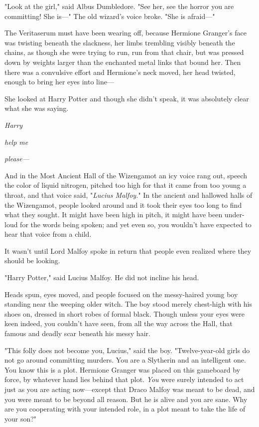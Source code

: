 "Look at the girl," said Albus Dumbledore. "See her, see the horror you are 
committing! She is---" The old wizard's voice broke. "She is afraid---"

The Veritaserum must have been wearing off, because Hermione Granger's face was 
twisting beneath the slackness, her limbs trembling visibly beneath the chains, 
as though she were trying to run, run from that chair, but was pressed down by 
weights larger than the enchanted metal links that bound her. Then there was a 
convulsive effort and Hermione's neck moved, her head twisted, enough to bring 
her eyes into line---

She looked at Harry Potter and though she didn't speak, it was absolutely clear 
what she was saying.

\emph{Harry}

\emph{help me}

\emph{please---}

And in the Most Ancient Hall of the Wizengamot an icy voice rang out, speech 
the color of liquid nitrogen, pitched too high for that it came from too young 
a throat, and that voice said, "\emph{Lucius Malfoy.}"
\sbreak
In the ancient and hallowed halls of the Wizengamot, people looked around and 
it took their eyes too long to find what they sought. It might have been high 
in pitch, it might have been under-loud for the words being spoken; and yet 
even so, you wouldn't have expected to hear that voice from a child.

It wasn't until Lord Malfoy spoke in return that people even realized where 
they should be looking.

"Harry Potter," said Lucius Malfoy. He did not incline his head.

Heads spun, eyes moved, and people focused on the messy-haired young boy 
standing near the weeping older witch. The boy stood merely chest-high with his 
shoes on, dressed in short robes of formal black. Though unless your eyes were 
keen indeed, you couldn't have seen, from all the way across the Hall, that 
famous and deadly scar beneath his messy hair.

"This folly does not become you, Lucius," said the boy. "Twelve-year-old girls 
do not go around committing murders. You are a Slytherin and an intelligent 
one. You know this is a plot. Hermione Granger was placed on this gameboard by 
force, by whatever hand lies behind that plot. \emph{You} were surely intended 
to act just as you are acting now---except that Draco Malfoy was meant to be 
dead, and you were meant to be beyond all reason. But he is alive and you are 
sane. Why are you cooperating with your intended role, in a plot meant to take 
the life of your son?"

